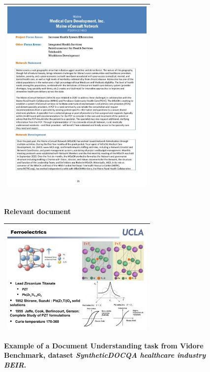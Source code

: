 \begin{figure}[h]
\begin{tabular}{|>{\centering\arraybackslash} p{0.7\linewidth}|}
\includegraphics[width=0.8\linewidth,frame]{figures/examples_assests/document_understanding/corpus_2.pdf} \\
\hline
\end{tabular}
\\
\textbf{Relevant document} 
\\
\begin{tabular}{|>{\centering\arraybackslash} p{0.7\linewidth}|}
\hline
\includegraphics[width=0.8\linewidth,frame]{figures/examples_assests/document_understanding/answer.pdf} \\
\hline
\end{tabular}
\caption{\textbf{Example of a Document Understanding task from Vidore Benchmark, dataset \emph{SyntheticDOCQA healthcare industry BEIR}.}}
\label{fig:doc_understanding_example}
\end{figure}